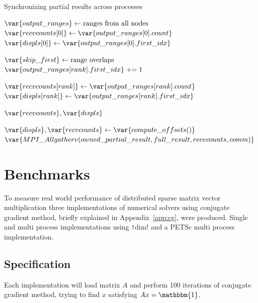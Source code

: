 \documentclass[thesis=M,english]{FITthesis}[2019/12/23]
\newcommand{\csre}[1]{\texttt!#1!}
\newcommand{\pluseq}{\mathrel{+}=}
\begin{document}
\begin{algorithm}[htp]
    \caption{Synchronizing partial results across processes}
    \begin{algorithmic}
        \State $\var{output\_ranges} \gets \text{ranges from all nodes}$
        \State $\var{recvcounts[0]} \gets \var{output\_ranges[0].count}$
        \State $\var{displs[0]} \gets \var{output\_ranges[0].first\_idx}$


        \State $\var{skip\_first} \gets \text{range overlaps}$
        \State $\var{output\_ranges[rank].first\_idx} \pluseq 1$
        \EndIf

        \State $\var{recvcounts[rank]} \gets \var{output\_ranges[rank].count}$
        \State $\var{displs[rank]} \gets \var{output\_ranges[rank].first\_idx}$

        \EndFor

        \Return $\var{recvcounts}, \var{displs}$

        \EndFunction

        \State $\var{displs}, \var{recvcounts} \gets \var{compute\_offsets()}$
        \State $\var{MPI\_Allgatherv(owned\_partial\_result, full\_result, recvcounts, comm)}$

        \EndFunction
    \end{algorithmic}
\end{algorithm}


\chapter{Benchmarks}

To measure real world performance of distributed sparse matrix vector multiplication
three implementations of numerical solvers using conjugate gradient method, briefly explained in
Appendix~\ref{app:cg}, were produced.
Single and multi process implementations using \csre{dim} and a PETSc multi process implementation.

\section{Specification}

Each implementation will load matrix $A$ and perform 100 iterations of conjugate
gradient method, trying to find $x$ satisfying $Ax=\mathbbm{1}$.
\end{document}
